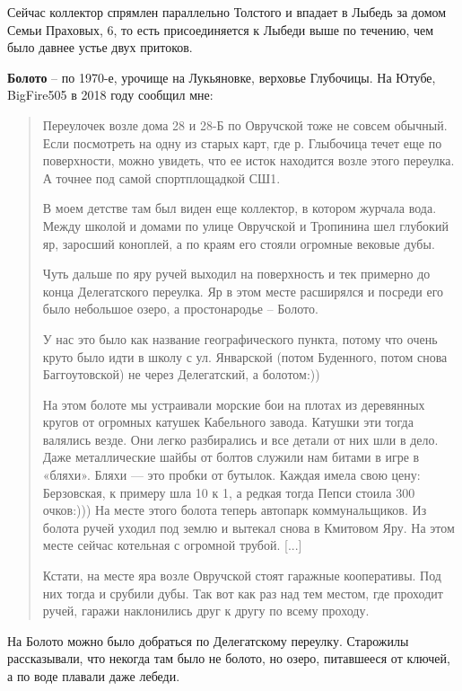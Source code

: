 Сейчас коллектор спрямлен параллельно Толстого и впадает в Лыбедь за домом Семьи Праховых, 6, то есть присоединяется к Лыбеди выше по течению, чем было давнее устье двух притоков.\\

\medskip


\textbf{Болото} – по 1970-е, урочище на Лукьяновке, верховье Глубочицы. На Ютубе, BigFire505 в 2018 году сообщил мне:

\begin{quotation}
Переулочек возле дома 28 и 28-Б по Овручской тоже не совсем обычный. Если посмотреть на одну из старых карт, где р. Глыбочица течет еще по поверхности, можно увидеть, что ее исток находится возле этого переулка. А точнее под самой спортплощадкой СШ1. 

В моем детстве там был виден еще коллектор, в котором журчала вода. Между школой и домами по улице Овручской и Тропинина шел глубокий яр, заросший коноплей, а по краям его стояли огромные вековые дубы. 

Чуть дальше по яру ручей выходил на поверхность и тек примерно до конца Делегатского переулка. Яр в этом месте расширялся и посреди его было небольшое озеро, а простонародье – Болото. 

У нас это было как название географического пункта, потому что оч\-ень круто было идти в школу с ул. Январской (потом Буденного, потом снова Баггоутовской) не через Делегатский, а болотом:))

На этом болоте мы устраивали морские бои на плотах из деревянных кругов от огромных катушек Кабельного завода. Катушки эти тогда валялись везде. Они легко разбирались и все детали от них шли в дело. Даже металлические шайбы от болтов служили нам битами в игре в «бляхи». Бляхи — это пробки от бутылок. Каждая имела свою цену: Берзовская, к примеру шла 10 к 1, а редкая тогда Пепси стоила 300 очков:))) На месте этого болота теперь автопарк коммунальщиков. Из болота ручей уходил под землю и вытекал снова в Кмитовом Яру. На этом месте сейчас котельная с огромной трубой. [...]

Кстати,  на месте яра возле Овручской стоят гаражные кооперативы. Под них тогда и срубили дубы. Так вот как раз над тем местом, где проходит ручей, гаражи наклонились друг к другу по всему проходу.﻿
\end{quotation} 

На Болото можно было добраться по Делегатскому переулку. Старожилы рассказывали, что некогда там было не болото, но озеро, питавшееся от ключей, а по воде плавали даже лебеди.\\

